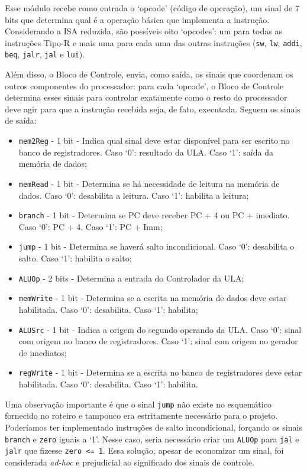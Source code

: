 \documentclass[a4paper,12pt]{article}
\newcommand{\cod}[1]{\texttt{#1}}
\begin{document}
Esse módulo recebe como entrada o `opcode' (código de operação), um sinal de 7 bits que determina qual é a operação básica que implementa a instrução. Considerando a ISA reduzida, são possíveis oito `opcodes': um para todas as instruções Tipo-R e mais uma para cada uma das outras instruções (\cod{sw}, \cod{lw}, \cod{addi}, \cod{beq}, \cod{jalr}, \cod{jal} e \cod{lui}).

Além disso, o Bloco de Controle, envia, como saída, os sinais que coordenam os outros componentes do processador: para cada `opcode', o Bloco de Controle determina esses sinais para controlar exatamente como o resto do processador deve agir para que a instrução recebida seja, de fato, executada. Seguem os sinais de saída:

\begin{itemize}
    \item \cod{mem2Reg} - 1 bit - Indica qual sinal deve estar disponível para ser escrito no banco de registradores. Caso `0': resultado da ULA. Caso `1': saída da memória de dados;
    \item \cod{memRead} - 1 bit - Determina se há necessidade de leitura na memória de dados. Caso `0': desabilita a leitura. Caso `1': habilita a leitura;
    \item \cod{branch} - 1 bit - Determina se PC deve receber PC + 4 ou PC + imediato. Caso `0': PC + 4. Caso `1': PC + Imm;
    \item \cod{jump} - 1 bit - Determina se haverá salto incondicional. Caso `0': desabilita o salto. Caso `1': habilita o salto;
    \item \cod{ALUOp} - 2 bits - Determina a entrada do Controlador da ULA;
    \item \cod{memWrite} - 1 bit - Determina se a escrita na memória de dados deve estar habilitada. Caso `0': desabilita. Caso `1': habilita;
    \item \cod{ALUSrc} - 1 bit - Indica a origem do segundo operando da ULA. Caso `0': sinal com origem no banco de registradores. Caso `1': sinal com origem no gerador de imediatos;
    \item \cod{regWrite} - 1 bit - Determina se a escrita no banco de registradores deve estar habilitada. Caso `0': desabilita. Caso `1': habilita.
\end{itemize}

Uma observação importante é que o sinal \cod{jump} não existe no esquemático fornecido no roteiro e tampouco era estritamente necessário para o projeto. Poderíamos ter implementado instruções de salto incondicional, forçando os sinais \cod{branch} e \cod{zero} iguais a `1'. Nesse caso, seria necessário criar um \cod{ALUOp} para \cod{jal} e \cod{jalr} que fizesse \cod{zero <= 1}. Essa solução, apesar de economizar um sinal, foi considerada \textit{ad-hoc} e prejudicial ao significado dos sinais de controle.
\end{document}
